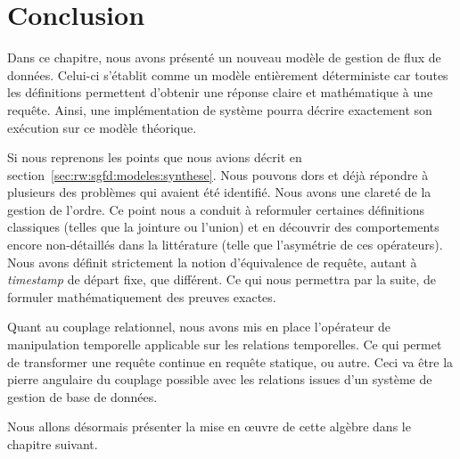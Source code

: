 \section{Conclusion}\label{sec:contrib:astral:conclusion}
Dans ce chapitre, nous avons présenté un nouveau modèle de gestion de flux de données. Celui-ci s'établit comme un modèle entièrement déterministe car toutes les définitions permettent d'obtenir une réponse claire et mathématique à une requête. Ainsi, une implémentation de système pourra décrire exactement son exécution sur ce modèle théorique.

Si nous reprenons les points que nous avions décrit en section~\ref{sec:rw:sgfd:modeles:synthese}. Nous pouvons dors et déjà répondre à plusieurs des problèmes qui avaient été identifié. Nous avons une clareté de la gestion de l'ordre. Ce point nous a conduit à reformuler certaines définitions classiques (telles que la jointure ou l'union) et en découvrir des comportements encore non-détaillés dans la littérature (telle que l'asymétrie de ces opérateurs). Nous avons définit strictement la notion d'équivalence de requête, autant à \textit{timestamp} de départ fixe, que différent. Ce qui nous permettra par la suite, de formuler mathématiquement des preuves exactes.

Quant au couplage relationnel, nous avons mis en place l'opérateur de manipulation temporelle applicable sur les relations temporelles. Ce qui permet de transformer une requête continue en requête statique, ou autre. Ceci va être la pierre angulaire du couplage possible avec les relations issues d'un système de gestion de base de données. 

Nous allons désormais présenter la mise en œuvre de cette algèbre dans le chapitre suivant.
